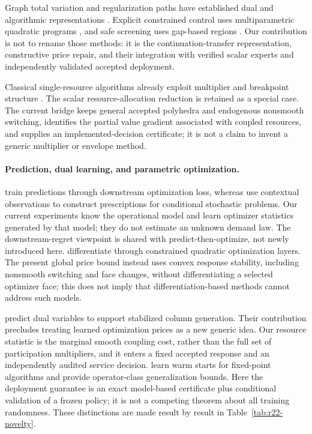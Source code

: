 \documentclass[11pt,letterpaper]{article}
\theoremstyle{definition}
\newcommand{\1}{\mathbf 1}
\begin{document}
Graph total variation and regularization paths have established dual and algorithmic representations \citep{TibshiraniTaylor2011,ArnoldTibshirani2016}. Explicit constrained control uses multiparametric quadratic programs \citep{Bemporad2002}, and safe screening uses gap-based regions \citep{Fercoq2015}. Our contribution is not to rename those methods: it is the continuation-transfer representation, constructive price repair, and their integration with verified scalar experts and independently validated accepted deployment.

Classical single-resource algorithms already exploit multiplier and breakpoint structure \citep{PatrikssonStromberg2015}. The scalar resource-allocation reduction is retained as a special case. The current bridge keeps general accepted polyhedra and endogenous nonsmooth switching, identifies the partial value gradient associated with coupled resources, and supplies an implemented-decision certificate; it is not a claim to invent a generic multiplier or envelope method.

\paragraph{Prediction, dual learning, and parametric optimization.}
\citet{ElmachtoubGrigas2022} train predictions through downstream optimization loss, whereas \citet{BertsimasKallus2020} use contextual observations to construct prescriptions for conditional stochastic problems. Our current experiments know the operational model and learn optimizer statistics generated by that model; they do not estimate an unknown demand law. The downstream-regret viewpoint is shared with predict-then-optimize, not newly introduced here. \citet{AmosKolter2017} differentiate through constrained quadratic optimization layers. The present global price bound instead uses convex response stability, including nonsmooth switching and face changes, without differentiating a selected optimizer face; this does not imply that differentiation-based methods cannot address such models.

\citet{KraulSeizingerBrunner2023} predict dual variables to support stabilized column generation. Their contribution precludes treating learned optimization prices as a new generic idea. Our resource statistic is the marginal smooth coupling cost, rather than the full set of participation multipliers, and it enters a fixed accepted response and an independently audited service decision. \citet{Sambharya2024} learn warm starts for fixed-point algorithms and provide operator-class generalization bounds. Here the deployment guarantee is an exact model-based certificate plus conditional validation of a frozen policy; it is not a competing theorem about all training randomness. These distinctions are made result by result in Table~\ref{tab:r22-novelty}.
\end{document}

